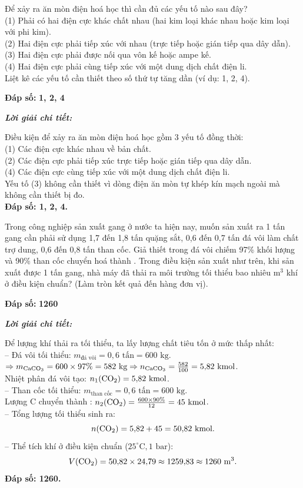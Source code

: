 \documentclass[11pt,a4paper]{article}
\def\loigiai#1{
\par\begingroup\color{blue!80!black}\small
\noindent\textbf{\textit{Lời giải chi tiết:}}\par
#1\par\endgroup}
\begin{document}
\begin{ex}
Để xảy ra ăn mòn điện hoá học thì cần đủ các yếu tố nào sau đây?\\
(1) Phải có hai điện cực khác chất nhau (hai kim loại khác nhau hoặc kim loại với phi kim).\\
(2) Hai điện cực phải tiếp xúc với nhau (trực tiếp hoặc gián tiếp qua dây dẫn).\\
(3) Hai điện cực phải được nối qua vôn kế hoặc ampe kế.\\
(4) Hai điện cực phải cùng tiếp xúc với một dung dịch chất điện li.\\
Liệt kê các yếu tố cần thiết theo số thứ tự tăng dần (ví dụ: 1, 2, 4).
\par\noindent\textbf{Đáp số:} \textbf{\color{red}1, 2, 4}
\loigiai{
Điều kiện để xảy ra ăn mòn điện hoá học gồm 3 yếu tố đồng thời:\\
(1) Các điện cực khác nhau về bản chất.\\
(2) Các điện cực phải tiếp xúc trực tiếp hoặc gián tiếp qua dây dẫn.\\
(4) Các điện cực cùng tiếp xúc với một dung dịch chất điện li.\\
Yếu tố (3) không cần thiết vì dòng điện ăn mòn tự khép kín mạch ngoài mà không cần thiết bị đo.\\
\textbf{Đáp số: 1, 2, 4.}}
\end{ex}

\begin{ex}
Trong công nghiệp sản xuất gang ở nước ta hiện nay, muốn sản xuất ra 1 tấn gang cần phải sử dụng 1,7 đến 1,8 tấn quặng sắt, 0,6 đến 0,7 tấn đá vôi làm chất trợ dung, 0,6 đến 0,8 tấn than cốc. Giả thiết trong đá vôi  chiếm 97\% khối lượng và 90\% than cốc chuyển hoá thành . Trong điều kiện sản xuất như trên, khi sản xuất được 1 tấn gang, nhà máy đã thải ra môi trường tối thiểu bao nhiêu $\text{m}^3$ khí  ở điều kiện chuẩn? (Làm tròn kết quả đến hàng đơn vị).
\par\noindent\textbf{Đáp số:} \textbf{\color{red}1260}
\loigiai{
Để lượng khí  thải ra tối thiểu, ta lấy lượng chất tiêu tốn ở mức thấp nhất:\\
-- Đá vôi tối thiểu: $m_{\text{đá vôi}} = 0{,}6\text{ tấn} = 600\text{ kg}$.\\
$\Rightarrow m_{\ce{CaCO3}} = 600 \times 97\% = 582\text{ kg} \Rightarrow n_{\ce{CaCO3}} = \frac{582}{100} = 5{,}82\text{ kmol}$.\\
Nhiệt phân đá vôi tạo: $n_1(\ce{CO2}) = 5{,}82\text{ kmol}$.\\
-- Than cốc tối thiểu: $m_{\text{than cốc}} = 0{,}6\text{ tấn} = 600\text{ kg}$.\\
Lượng C chuyển thành \ce{CO2}: $n_2(\ce{CO2}) = \frac{600 \times 90\%}{12} = 45\text{ kmol}$.\\
-- Tổng lượng \ce{CO2} tối thiểu sinh ra:
$$n(\ce{CO2}) = 5{,}82 + 45 = 50{,}82\text{ kmol.}$$
-- Thể tích khí \ce{CO2} ở điều kiện chuẩn ($25^\circ\text{C}, 1\text{ bar}$):
$$V(\ce{CO2}) = 50{,}82 \times 24{,}79 \approx 1259{,}83 \approx 1260\text{ m}^3.$$
\textbf{Đáp số: 1260.}}
\end{ex}
\end{document}
